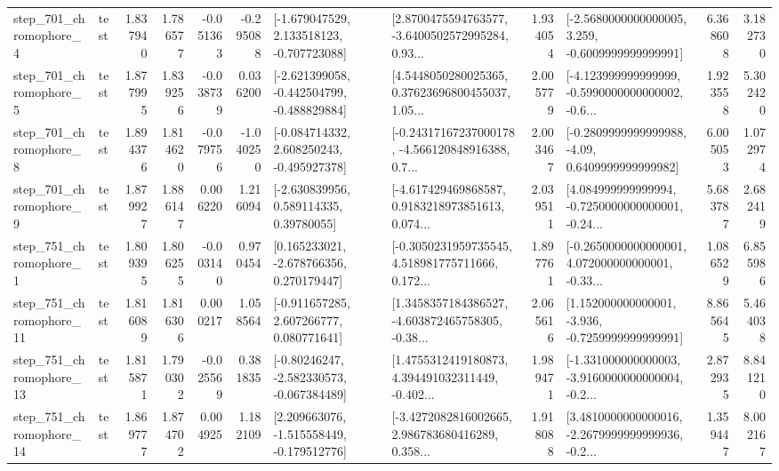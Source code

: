 \begin{tabular}{llrrrrllrlrr}
   step\_701\_chromophore\_4 &      test &      1.837940 &    1.786577 &     -0.051363 & -0.295088 &   [-1.679047529, 2.133518123, -0.707723088] &  [2.8700475594763577, -3.6400502572995284, 0.93... &       1.934054 &  [-2.5680000000000005, 3.259, -0.6009999999999991] &            6.368608 &          3.182730 \\
   step\_701\_chromophore\_5 &      test &      1.877995 &    1.839256 &     -0.038739 &  0.036200 &  [-2.621399058, -0.442504799, -0.488829884] &  [4.5448050280025365, 0.37623696800455037, 1.05... &       2.005779 &  [-4.123999999999999, -0.5990000000000002, -0.6... &            1.923558 &          5.302420 \\
   step\_701\_chromophore\_8 &      test &      1.894376 &    1.814620 &     -0.079756 & -1.040250 &   [-0.084714332, 2.608250243, -0.495927378] &  [-0.24317167237000178, -4.566120848916388, 0.7... &       2.003467 &   [-0.2809999999999988, -4.09, 0.6409999999999982] &            6.005053 &          1.072974 \\
   step\_701\_chromophore\_9 &      test &      1.879927 &    1.886147 &      0.006220 &  1.216094 &     [-2.630839956, 0.589114335, 0.39780055] &  [-4.617429469868587, 0.9183218973851613, 0.074... &       2.039511 &  [4.084999999999994, -0.7250000000000001, -0.24... &            5.683787 &          2.682419 \\
   step\_751\_chromophore\_1 &      test &      1.809395 &    1.806255 &     -0.003140 &  0.970454 &    [0.165233021, -2.678766356, 0.270179447] &  [-0.3050231959735545, 4.518981775711666, 0.172... &       1.897761 &  [-0.2650000000000001, 4.072000000000001, -0.33... &            1.086529 &          6.855986 \\
  step\_751\_chromophore\_11 &      test &      1.816089 &    1.816306 &      0.000217 &  1.058564 &    [-0.911657285, 2.607266777, 0.080771641] &  [1.3458357184386527, -4.603872465758305, -0.38... &       2.065616 &   [1.152000000000001, -3.936, -0.7259999999999991] &            8.865645 &          5.464038 \\
  step\_751\_chromophore\_13 &      test &      1.815871 &    1.790302 &     -0.025569 &  0.381835 &   [-0.80246247, -2.582330573, -0.067384489] &  [1.4755312419180873, 4.394491032311449, -0.402... &       1.989471 &  [-1.331000000000003, -3.9160000000000004, -0.2... &            2.872935 &          8.841210 \\
  step\_751\_chromophore\_14 &      test &      1.869777 &    1.874702 &      0.004925 &  1.182109 &   [2.209663076, -1.515558449, -0.179512776] &  [-3.4272082816002665, 2.986783680416289, 0.358... &       1.918088 &  [3.4810000000000016, -2.2679999999999936, -0.2... &            1.359447 &          8.002167 \\

\end{tabular}
